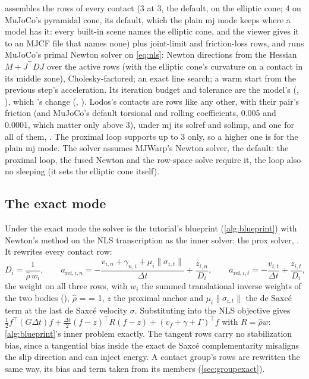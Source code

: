  assembles the rows of every contact (3 at  3, the default, on the elliptic cone; 4 on MuJoCo's pyramidal cone, its default, which the plain mj mode keeps where a model has it: every built-in scene names the elliptic cone, and the viewer gives it to an MJCF file that names none) plus joint-limit and friction-loss rows, and  runs MuJoCo's primal Newton solver on \cref{eq:nls}: Newton directions from the Hessian $M + J^\top D J$ over the active rows (with the elliptic cone's curvature on a contact in its middle zone), Cholesky-factored; an exact line search; a warm start from the previous step's acceleration. Its iteration budget and tolerance are the model's (, ), which 's  change (, ). Lodos's contacts are rows like any other, with their pair's friction (and MuJoCo's default torsional and rolling coefficients, 0.005 and 0.0001, which matter only above  3), under mj its solref and solimp, and one  for all of them, . The proximal loop supports  up to 3 only, so a higher one is for the plain mj mode. The solver assumes MJWarp's Newton solver, the default: the proximal loop, the fused Newton and the row-space solve require it, the loop also no sleeping (it sets the elliptic cone itself).

\subsection{The exact mode}\label{sec:pcexact}

Under the exact mode the solver is the tutorial's blueprint (\cref{alg:blueprint}) with Newton's method on the NLS transcription as the inner solver: the prox solver, . It rewrites every contact row:
\begin{equation}\label{eq:proxrows}
D_i = \frac{1}{\hat\rho\, w_i}, \qquad
a_{\text{ref},i,n} = -\frac{v_{i,n} + \gamma_{n,i} + \mu_i\lVert\sigma_{i,t}\rVert}{\Delta t} + \frac{z_{i,n}}{D_i}, \qquad
a_{\text{ref},i,t} = -\frac{v_{i,t}}{\Delta t} + \frac{z_{i,t}}{D_i},
\end{equation}
the weight on all three rows, with $w_i$ the summed translational inverse weights of the two bodies (), $\hat\rho$ =  = 1, $z$ the proximal anchor and $\mu_i\lVert\sigma_{i,t}\rVert$ the de Saxc\'e term at the last de Saxc\'e velocity $\sigma$. Substituting into the NLS objective gives $\tfrac12 f^\top(G\Delta t) f + \tfrac{\Delta t}{2} (f - z)^\top R (f - z) + (v_f + \gamma + \Gamma)^\top f$ with $R = \hat\rho w$: \cref{alg:blueprint}'s inner problem exactly. The tangent rows carry no stabilization bias, since a tangential bias inside the exact de Saxc\'e complementarity misaligns the slip direction and can inject energy. A contact group's rows are rewritten the same way, its bias and term taken from its members (\cref{sec:groupexact}).

